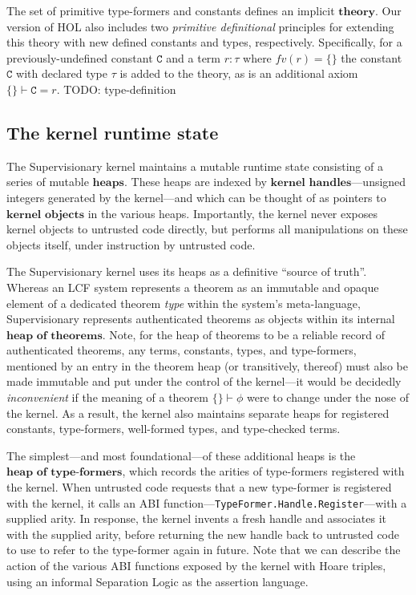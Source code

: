\documentclass[a4paper, 10pt]{article}
\newcommand{\deffont}[1]{\ensuremath{\textbf{#1}}}
\begin{document}
The set of primitive type-formers and constants defines an implicit \deffont{theory}.
Our version of HOL also includes two \emph{primitive definitional} principles for extending this theory with new defined constants and types, respectively.
Specifically, for a previously-undefined constant $\mathtt{C}$ and a term $r : \tau$ where $fv(r) = \{\}$ the constant $\mathtt{C}$ with declared type $\tau$ is added to the theory, as is an additional axiom $\{\} \vdash \mathtt{C} = r$.
TODO: type-definition

\subsection{The kernel runtime state}
\label{subsect.the.kernel.runtime.state}

The Supervisionary kernel maintains a mutable runtime state consisting of a series of mutable \deffont{heaps}.
These heaps are indexed by \deffont{kernel handles}---unsigned integers generated by the kernel---and which can be thought of as pointers to \deffont{kernel objects} in the various heaps.
Importantly, the kernel never exposes kernel objects to untrusted code directly, but performs all manipulations on these objects itself, under instruction by untrusted code.

The Supervisionary kernel uses its heaps as a definitive ``source of truth''.
Whereas an LCF system represents a theorem as an immutable and opaque element of a dedicated theorem \emph{type} within the system's meta-language, Supervisionary represents authenticated theorems as objects within its internal \deffont{heap of theorems}.
Note, for the heap of theorems to be a reliable record of authenticated theorems, any terms, constants, types, and type-formers, mentioned by an entry in the theorem heap (or transitively, thereof) must also be made immutable and put under the control of the kernel---it would be decidedly \emph{inconvenient} if the meaning of a theorem $\{ \} \vdash \phi$ were to change under the nose of the kernel.
As a result, the kernel also maintains separate heaps for registered constants, type-formers, well-formed types, and type-checked terms.

The simplest---and most foundational---of these additional heaps is the \deffont{heap of type-formers}, which records the arities of type-formers registered with the kernel.
When untrusted code requests that a new type-former is registered with the kernel, it calls an ABI function---\texttt{TypeFormer.Handle.Register}---with a supplied arity.
In response, the kernel invents a fresh handle and associates it with the supplied arity, before returning the new handle back to untrusted code to use to refer to the type-former again in future.
Note that we can describe the action of the various ABI functions exposed by the kernel with Hoare triples, using an informal Separation Logic as the assertion language.
\end{document}
